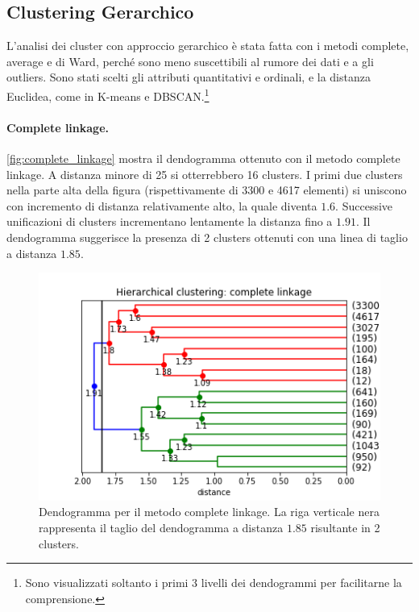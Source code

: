 \documentclass[10pt,a4paper,twocolumn]{article}
\begin{document}
\subsection{Clustering Gerarchico}
L'analisi dei cluster con approccio gerarchico è stata fatta con i metodi complete, average e di Ward, perché sono meno suscettibili al rumore dei dati e a gli outliers. Sono stati scelti gli attributi quantitativi e ordinali, e la distanza Euclidea, come in K-means e DBSCAN.\footnote{Sono visualizzati soltanto i primi 3 livelli dei dendogrammi per facilitarne la comprensione.}  

\paragraph{Complete linkage.}
\autoref{fig:complete_linkage} mostra il dendogramma ottenuto con il metodo complete linkage. A distanza minore di 25 si otterrebbero 16 clusters. I primi due clusters nella parte alta della figura (rispettivamente di 3300 e 4617 elementi) si uniscono con incremento di distanza relativamente alto, la quale diventa $1.6$. Successive unificazioni di clusters incrementano lentamente la distanza fino a $1.91$.
Il dendogramma suggerisce la presenza di 2 clusters ottenuti con una linea di taglio a distanza $1.85$.

\begin{figure}[hbtp]
\centering
\includegraphics[width=\columnwidth]{../images/hierarchical_clustering_complete-annotated.png}
\caption{Dendogramma per il metodo complete linkage. La riga verticale nera rappresenta il taglio del dendogramma a distanza $1.85$ risultante in 2 clusters.}
\label{fig:complete_linkage}
\end{figure}
\end{document}
